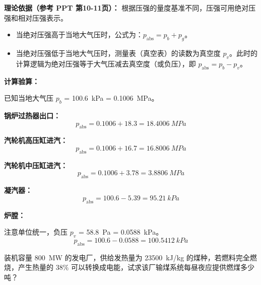 \begin{solution}
\textbf{理论依据（参考 PPT 第10-11页）：} 根据压强的量度基准不同，压强可用绝对压强和相对压强表示。

\begin{itemize}
  \item 当绝对压强高于当地大气压时，公式为：\(p_{\text{abs}} = p_b + p_g\)。
  \item 当绝对压强低于当地大气压时，测量表（真空表）的读数为真空度 \(p_v\)。此时的计算逻辑为绝对压强等于大气压减去真空度（或负压），即 \(p_{\text{abs}} = p_b - p_v\)。
\end{itemize}

\textbf{计算验算：}

已知当地大气压 \(p_b\) = \qty{100.6}{kPa} = \qty{0.1006}{MPa}。

\textbf{锅炉过热器出口：}
\begin{equation*}
p_{\text{abs}} = 0.1006 + 18.3 = \qty{18.4006}{MPa}
\end{equation*}

\textbf{汽轮机高压缸进汽：}
\begin{equation*}
p_{\text{abs}} = 0.1006 + 16.7 = \qty{16.8006}{MPa}
\end{equation*}

\textbf{汽轮机中压缸进汽：}
\begin{equation*}
p_{\text{abs}} = 0.1006 + 3.78 = \qty{3.8806}{MPa}
\end{equation*}

\textbf{凝汽器：}
\begin{equation*}
p_{\text{abs}} = 100.6 - 5.39 = \qty{95.21}{kPa}
\end{equation*}

\textbf{炉膛：}

注意单位统一，负压 \(p_v\) = \qty{58.8}{Pa} = \qty{0.0588}{kPa}。
\begin{equation*}
p_{\text{abs}} = 100.6 - 0.0588 = \qty{100.5412}{kPa}
\end{equation*}
\end{solution}

\begin{problem}[发电厂日耗煤量计算]
装机容量 \qty{800}{MW} 的发电厂，供给发热量为 \qty{23500}{kJ/kg} 的煤种，若燃料完全燃烧，产生热量的 \(38\%\) 可以转换成电能，试求该厂输煤系统每昼夜应提供燃煤多少吨？
\end{problem}

